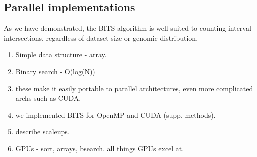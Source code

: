 \documentclass{bioinfo}
\begin{document}
	\subsection{Parallel implementations}
	
	As we have demonstrated, the BITS algorithm is well-suited to counting
	interval intersections, regardless of dataset size or genomic distribution.
	
	\begin{enumerate}
		\item Simple data structure - array.
		\item Binary search - O(log(N))
		\item these make it easily portable to parallel architectures, even 
		      more complicated archs such as CUDA.
		\item we implemented BITS for OpenMP and CUDA (supp. methods).
		\item describe scaleups.
		\item GPUs - sort, arrays, bsearch.  all things GPUs excel at.
	\end{enumerate}	
	  
\end{document}
